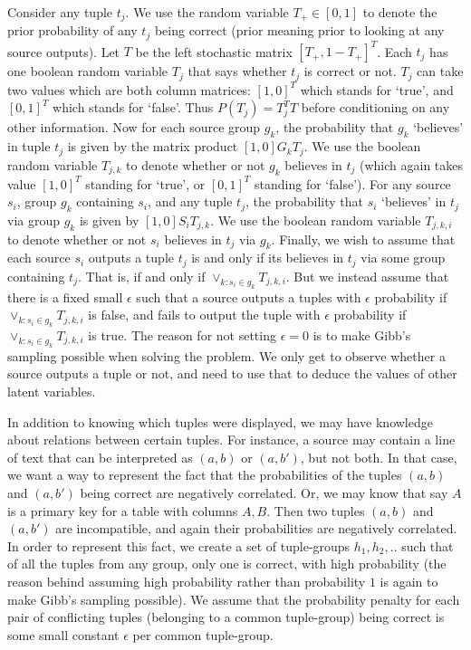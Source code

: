 \documentclass{sig-alternate}
\newcounter{prob}
\begin{document}
Consider any tuple $t_j$. We use the random variable $T_{+} \in [0,1]$ to denote the prior probability of any $t_j$ being correct (prior meaning prior to looking at any source outputs). Let $T$ be the left stochastic matrix $[T_{+},1-T_{+}]^T$. Each $t_j$ has one boolean random variable $T_j$ that says whether $t_j$ is correct or not. $T_j$ can take two values which are both column matrices: $[1,0]^T$ which stands for `true', and $[0,1]^T$ which stands for `false'. Thus $P(T_j) = T_{j}^{T}T$ before conditioning on any other information. Now for each source group $g_k$, the probability that $g_k$ `believes' in tuple $t_j$ is given by the matrix product $[1,0]G_kT_j$. We use the boolean random variable $T_{j,k}$ to denote whether or not $g_k$ believes in $t_j$ (which again takes value $[1,0]^T$ standing for `true', or $[0,1]^T$ standing for `false'). For any source $s_i$, group $g_k$ containing $s_i$, and any tuple $t_j$, the probability that $s_i$ `believes' in $t_j$ via group $g_k$ is given by $[1,0]S_iT_{j,k}$. We use the boolean random variable $T_{j,k,i}$ to denote whether or not $s_i$ believes in $t_j$ via $g_k$. Finally, we wish to assume that each source $s_i$ outputs a tuple $t_j$ is and only if its believes in $t_j$ via some group containing $t_j$. That is, if and only if $\lor_{k : s_i \in g_k} T_{j,k,i}$. But we instead assume that there is a fixed small $\epsilon$ such that a source outputs a tuples with $\epsilon$ probability if $\lor_{k : s_i \in g_k} T_{j,k,i}$ is false, and fails to output the tuple with $\epsilon$ probability if $\lor_{k : s_i \in g_k} T_{j,k,i}$ is true. The reason for not setting $\epsilon = 0$ is to make Gibb's sampling possible when solving the problem. We only get to observe whether a source outputs a tuple or not, and need to use that to deduce the values of other latent variables. 

In addition to knowing which tuples were displayed, we may have knowledge about relations between certain tuples. For instance, a source may contain a line of text that can be interpreted as $(a,b)$ or $(a, b')$, but not both. In that case, we want a way to represent the fact that the probabilities of the tuples $(a, b)$ and $(a, b')$ being correct are negatively correlated. Or, we may know that say $A$ is a primary key for a table with columns $A,B$. Then two tuples $(a,b)$ and $(a,b')$ are incompatible, and again their probabilities are negatively correlated. In order to represent this fact, we create a set of tuple-groups $h_1, h_2, ..$ such that of all the tuples from any group, only one is correct, with high probability (the reason behind assuming high probability rather than probability $1$ is again to make Gibb's sampling possible). We assume that the probability penalty for each pair of conflicting tuples (belonging to a common tuple-group) being correct is some small constant $\epsilon$ per common tuple-group. 
\end{document}
